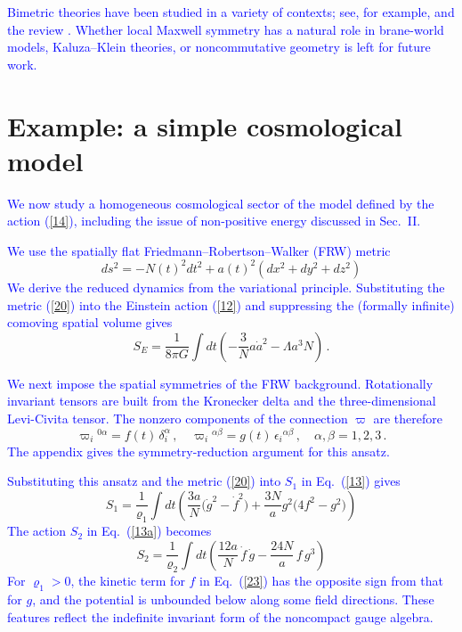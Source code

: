 \documentclass [prd,reprint,eqsecnum,nofootinbib]  {revtex4-1}
\newcommand{\lang}[1]{\textcolor{blue}{#1}}
\begin{document}
\lang{Bimetric theories have been studied in a variety of contexts;
see, for example, \cite{Banados:2008fi,Damour:2002wu,Damour:2002ws,
ArkaniHamed:2002sp,Blas:2005yk,Speziale:2010cf} and the review
\cite{Clifton:2011jh}. Whether local Maxwell symmetry has a natural
role in brane-world models, Kaluza--Klein theories, or noncommutative
geometry is left for future work.}

\section{Example: a simple cosmological model}

\lang{We now study a homogeneous cosmological sector of the model
defined by the action (\ref{14}), including the issue of
non-positive energy discussed in Sec.~II.}

\lang{We use the spatially flat Friedmann--Robertson--Walker (FRW)
metric}
\begin{equation}\label{20}
    ds^2 =-N(t)^2dt^2+a(t)^2 (dx^2+dy^2+dz^2)
\end{equation}
\lang{We derive the reduced dynamics from the variational principle.
Substituting the metric (\ref{20}) into the Einstein action (\ref{12})
and suppressing the (formally infinite) comoving spatial volume gives}
\begin{equation}
S_E=\frac{1}{8\pi G}\int dt \left(-\frac{3}{N}a\dot a^2-\Lambda a^3
N\right)\,.\label{21}
\end{equation}

\lang{We next impose the spatial symmetries of the FRW background.
Rotationally invariant tensors are built from the Kronecker delta and
the three-dimensional Levi-Civita tensor. The nonzero components of
the connection $\varpi$ are therefore}
\begin{equation}\label{22}
    \varpi_i{}^{0\alpha} = f(t)\, \delta_i^\alpha\,,
    \quad \varpi_i{}^{\alpha\beta} = g(t)\,
    \epsilon_i{}^{\alpha\beta}\,,\quad \alpha,\beta=1,2,3\,.
\end{equation}
\lang{The appendix gives the symmetry-reduction argument for this ansatz.}

\lang{Substituting this ansatz and the metric (\ref{20}) into $S_1$
in Eq.~(\ref{13}) gives}
\begin{equation}
    S_1 =\frac1{\varrho_1}\int dt \left( \frac{3a}{N}\Big(\dot{g}^2 -\dot{f}^2\Big)
+ \frac{3N}{a} g^2\Big(4f^2-g^2\Big) \right)\label{23}
\end{equation}
\lang{The action $S_2$ in Eq.~(\ref{13a}) becomes}
\begin{equation}
    S_2 =\frac1{\varrho_2}\int dt \left( \frac{12a}{N}\, \dot f\,\dot g - \frac{24N}{a}\, f\, g^3\right)\label{24}
\end{equation}
\lang{For $\varrho_1>0$, the kinetic term for $f$ in Eq.~(\ref{23})
has the opposite sign from that for $g$, and the potential is
unbounded below along some field directions. These features reflect
the indefinite invariant form of the noncompact gauge algebra.}
\end{document}
